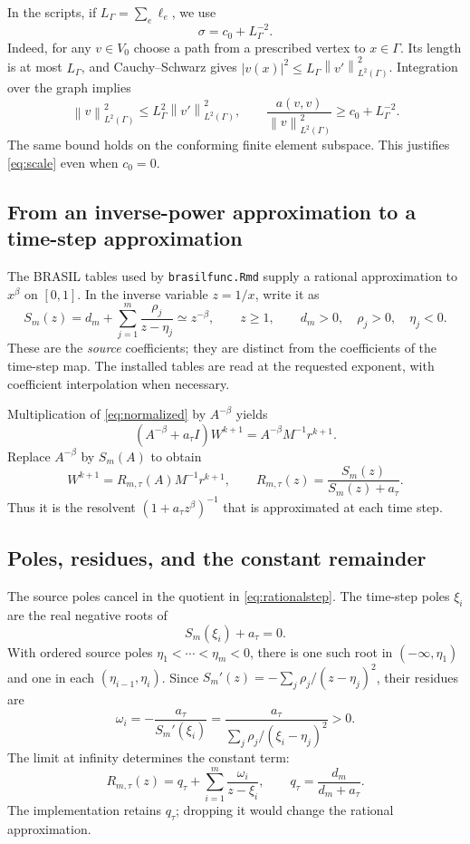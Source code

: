 \documentclass[11pt,a4paper]{article}
\newcommand{\G}{\Gamma}
\newcommand{\norm}[1]{\left\lVert#1\right\rVert}
\begin{document}
In the scripts, if $L_\G=\sum_e\ell_e$, we use
\begin{equation}\label{eq:scale}
 \sigma=c_0+L_\G^{-2}.
\end{equation}
Indeed, for any $v\in V_0$ choose a path from a prescribed vertex to
$x\in\G$. Its length is at most $L_\G$, and Cauchy--Schwarz gives
$|v(x)|^2\leq L_\G\norm{v'}_{L^2(\G)}^2$. Integration over the graph
implies
\[
 \norm{v}_{L^2(\G)}^2\leq L_\G^2\norm{v'}_{L^2(\G)}^2,
 \qquad
 \frac{a(v,v)}{\norm{v}_{L^2(\G)}^2}\geq c_0+L_\G^{-2}.
\]
The same bound holds on the conforming finite element subspace. This
justifies \eqref{eq:scale} even when $c_0=0$.

\subsection{From an inverse-power approximation to a time-step approximation}
The BRASIL tables used by \texttt{brasilfunc.Rmd} supply a rational
approximation to $x^\beta$ on $[0,1]$. In the inverse variable $z=1/x$,
write it as
\begin{equation}\label{eq:source}
 S_m(z)=d_m+\sum_{j=1}^m\frac{\rho_j}{z-\eta_j}
          \simeq z^{-\beta},\qquad z\geq1,
 \qquad d_m>0,\quad\rho_j>0,\quad\eta_j<0.
\end{equation}
These are the \emph{source} coefficients; they are distinct from the
coefficients of the time-step map. The installed tables are read at the
requested exponent, with coefficient interpolation when necessary.

Multiplication of \eqref{eq:normalized} by $A^{-\beta}$ yields
\[
 (A^{-\beta}+a_\tau I)W^{k+1}=A^{-\beta}M^{-1}r^{k+1}.
\]
Replace $A^{-\beta}$ by $S_m(A)$ to obtain
\begin{equation}\label{eq:rationalstep}
 W^{k+1}=R_{m,\tau}(A)M^{-1}r^{k+1},\qquad
 R_{m,\tau}(z)=\frac{S_m(z)}{S_m(z)+a_\tau}.
\end{equation}
Thus it is the resolvent $(1+a_\tau z^\beta)^{-1}$ that is
approximated at each time step.

\subsection{Poles, residues, and the constant remainder}
The source poles cancel in the quotient in \eqref{eq:rationalstep}.
The time-step poles $\xi_i$ are the real negative roots of
\[
 S_m(\xi_i)+a_\tau=0.
\]
With ordered source poles $\eta_1<\cdots<\eta_m<0$, there is one such
root in $(-\infty,\eta_1)$ and one in each
$(\eta_{i-1},\eta_i)$. Since
$S_m'(z)=-\sum_j\rho_j/(z-\eta_j)^2$, their residues are
\begin{equation}\label{eq:residues}
 \omega_i=-\frac{a_\tau}{S_m'(\xi_i)}
     =\frac{a_\tau}{\displaystyle\sum_j
                      \rho_j/(\xi_i-\eta_j)^2}>0.
\end{equation}
The limit at infinity determines the constant term:
\begin{equation}\label{eq:timepf}
 R_{m,\tau}(z)=q_\tau+\sum_{i=1}^m\frac{\omega_i}{z-\xi_i},
 \qquad q_\tau=\frac{d_m}{d_m+a_\tau}.
\end{equation}
The implementation retains $q_\tau$; dropping it would change the
rational approximation.
\end{document}
